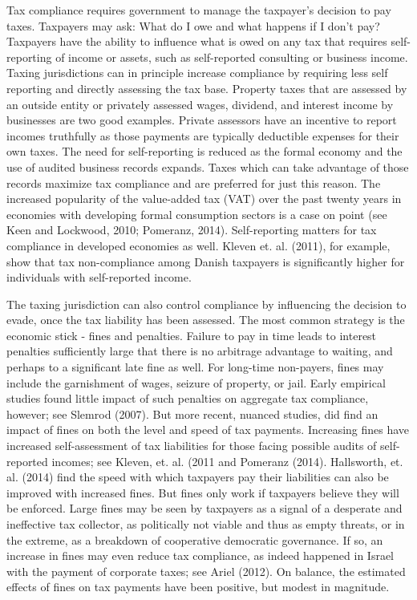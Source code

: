 \documentclass[12pt,titlepage]{article}
\begin{document}
Tax compliance requires government to manage the taxpayer's decision to pay taxes.  
Taxpayers may ask: What do I owe and what happens if I don't pay? 
Taxpayers have the ability to influence what is owed on any tax that requires self-reporting of income or assets, such as self-reported consulting or business income. 
Taxing jurisdictions can in principle increase compliance by requiring less self reporting and directly assessing the tax base. 
Property taxes that are assessed by an outside entity or privately assessed wages, dividend, and interest income by businesses are two good examples.  
Private assessors have an incentive to report incomes truthfully as those payments are typically deductible expenses for their own taxes. 
The need for self-reporting is reduced as the formal economy and the use of audited business records expands. 
Taxes which can take advantage of those records maximize tax compliance and are preferred for just this reason. 
The increased popularity of the value-added tax (VAT) over the past twenty years in economies with developing formal 
consumption sectors is a case on point (see Keen and Lockwood, 2010; Pomeranz, 2014). 
Self-reporting matters for tax compliance in developed economies as well.  
Kleven et. al. (2011), for example, show that tax non-compliance among Danish taxpayers is significantly higher for individuals with self-reported income. 

The taxing jurisdiction can also control compliance by influencing the
decision to evade, once the tax liability has been assessed.  The most
common strategy is the economic stick - fines and penalties.  Failure
to pay in time leads to interest penalties sufficiently large that
there is no arbitrage advantage to waiting, and perhaps to a
significant late fine as well.  For long-time non-payers, fines may
include the garnishment of wages, seizure of property, or jail.  Early
empirical studies found little impact of such penalties on aggregate
tax compliance, however; see Slemrod (2007).  But more recent, nuanced
studies, did find an impact of fines on both the level and speed of
tax payments.  Increasing fines have increased self-assessment of tax
liabilities for those facing possible audits of self-reported incomes;
see Kleven, et. al. (2011 and Pomeranz (2014).  Hallsworth, et. al.
(2014) find the speed with which taxpayers pay their liabilities can
also be improved with increased fines.  But fines only work if
taxpayers believe they will be enforced.  Large fines may be seen by
taxpayers as a signal of a desperate and ineffective tax collector, as
politically not viable and thus as empty threats, or in the extreme,
as a breakdown of cooperative democratic governance.  If so, an
increase in fines may even reduce tax compliance, as indeed happened
in Israel with the payment of corporate taxes; see Ariel (2012).  On
balance, the estimated effects of fines on tax payments have been
positive, but modest in magnitude.
\end{document}
